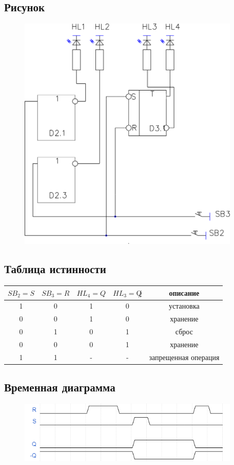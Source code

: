 \documentclass[a4paper]{article}
\begin{document}
\subsection{Рисунок}
\begin{figure}[H]
    \centering
    \includegraphics[width=300pt]{s3.png}
\end{figure}

\subsection{Таблица истинности}
\begin{table}[H]
\centering
\begin{tabular}{|c|c|c|c|c|}
\hline
$SB_2 = S$ & $SB_3 = R$ & $HL_4 = Q$ & $HL_3 = \not Q$ & описание \\
\hline
1 & 0 & 1 & 0 & установка\\
0 & 0 & 1 & 0 & хранение\\
0 & 1 & 0 & 1 & сброс \\
0 & 0 & 0 & 1 & хранение \\
1 & 1 & - & - & запрещенная операция \\
\hline
\end{tabular}
\end{table}

\subsection{Временная диаграмма}
\begin{figure}[H]
    \centering
    \includegraphics[width=300pt]{d1.png}
\end{figure}
\end{document}
